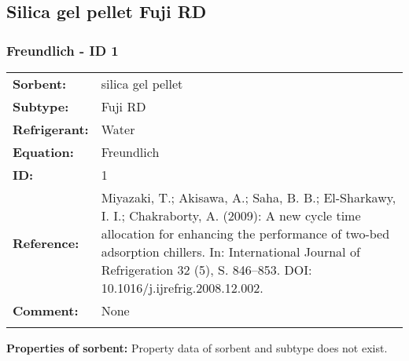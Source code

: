 \subsection{Silica gel pellet Fuji RD}
%
\subsubsection{Freundlich - ID 1}
%
\begin{tabular}[l]{|lp{11.5cm}|}
\hline
\addlinespace

\textbf{Sorbent:} & silica gel pellet \\
\textbf{Subtype:} & Fuji RD \\
\textbf{Refrigerant:} & Water \\
\textbf{Equation:} & Freundlich \\
\textbf{ID:} & 1 \\
\textbf{Reference:} & Miyazaki, T.; Akisawa, A.; Saha, B. B.; El-Sharkawy, I. I.; Chakraborty, A. (2009): A new cycle time allocation for enhancing the performance of two-bed adsorption chillers. In: International Journal of Refrigeration 32 (5), S. 846–853. DOI: 10.1016/j.ijrefrig.2008.12.002. \\
\textbf{Comment:} & None \\

\addlinespace
\hline
\end{tabular}
\newline

\textbf{Properties of sorbent:}
\newline
%
Property data of sorbent and subtype does not exist.

